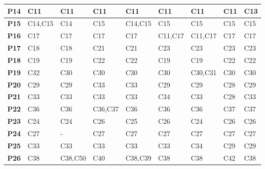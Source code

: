 \begin{longtable}{|M{1.0cm}|M{1.5cm}|M{1.5cm}|M{1.5cm}|M{1.5cm}|M{1.5cm}|M{1.5cm}|M{1.5cm}|M{1.5cm}|}
\textbf{P14} & C11            & C11            & C11            & C11             & C11            & C11            & C11            & C13            \\ \hline
\textbf{P15} & C14,C15        & C14            & C15            & C14,C15         & C15            & C15            & C15            & C15            \\ \hline
\textbf{P16} & C17            & C17            & C17            & C17             & C11,C17        & C11,C17        & C17            & C17            \\ \hline
\textbf{P17} & C18            & C18            & C21            & C21             & C23            & C23            & C23            & C23            \\ \hline
\textbf{P18} & C19            & C19            & C22            & C22             & C19            & C19            & C22            & C22            \\ \hline
\textbf{P19} & C32            & C30            & C30            & C30             & C30            & C30,C31        & C30            & C30            \\ \hline
\textbf{P20} & C29            & C29            & C33            & C33             & C29            & C29            & C28            & C29            \\ \hline
\textbf{P21} & C33            & C33            & C33            & C33             & C34            & C33            & C28            & C33            \\ \hline
\textbf{P22} & C36            & C36            & C36,C37        & C36             & C36            & C36            & C37            & C37            \\ \hline
\textbf{P23} & C24            & C24            & C26            & C25             & C26            & C24            & C26            & C26            \\ \hline
\textbf{P24} & C27            & -              & C27            & C27             & C27            & C27            & C27            & C27            \\ \hline
\textbf{P25} & C33            & C33            & C33            & C33             & C33            & C34            & C29            & C29            \\ \hline
\textbf{P26} & C38            & C38,C50        & C40            & C38,C39         & C38            & C38            & C42            & C38            \\ \hline

\end{longtable}
